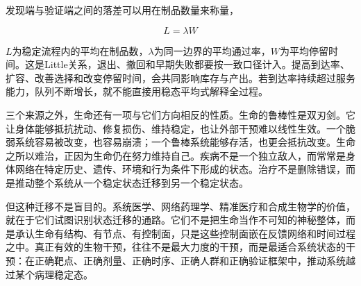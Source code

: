 发现端与验证端之间的落差可以用在制品数量来称量，

\begin{equation}
L=\lambda W
\end{equation}

$L$为稳定流程内的平均在制品数，$\lambda$为同一边界的平均通过率，$W$为平均停留时间。这是Little关系，退出、撤回和早期失败都要按一致口径计入。提高到达率、扩容、改善选择和改变停留时间，会共同影响库存与产出。若到达率持续超过服务能力，队列不断增长，就不能直接用稳态平均式解释全过程。

三个来源之外，生命还有一项与它们方向相反的性质。生命的鲁棒性是双刃剑。它让身体能够抵抗扰动、修复损伤、维持稳定，也让外部干预难以线性生效。一个脆弱系统容易被改变，也容易崩溃；一个鲁棒系统能够存活，也更会抵抗改变。生命之所以难治，正因为生命仍在努力维持自己。疾病不是一个独立敌人，而常常是身体网络在特定历史、遗传、环境和行为条件下形成的状态。治疗不是删除错误，而是推动整个系统从一个稳定状态迁移到另一个稳定状态。

但这种迁移不是盲目的。系统医学、网络药理学、精准医疗和合成生物学的价值，就在于它们试图识别状态迁移的通路。它们不是把生命当作不可知的神秘整体，而是承认生命有结构、有节点、有控制面，只是这些控制面嵌在反馈网络和时间过程之中。真正有效的生物干预，往往不是最大力度的干预，而是最适合系统状态的干预：在正确靶点、正确剂量、正确时序、正确人群和正确验证框架中，推动系统越过某个病理稳定态。

